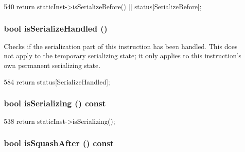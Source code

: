 \begin{DoxyCode}
540     { return staticInst->isSerializeBefore() || status[SerializeBefore]; }
\end{DoxyCode}
\hypertarget{classBaseDynInst_a33db384950219c3c71206fbb2c7d8025}{
\subsubsection[{isSerializeHandled}]{\setlength{\rightskip}{0pt plus 5cm}bool isSerializeHandled ()}}
\label{classBaseDynInst_a33db384950219c3c71206fbb2c7d8025}
Checks if the serialization part of this instruction has been handled. This does not apply to the temporary serializing state; it only applies to this instruction's own permanent serializing state. 


\begin{DoxyCode}
584 { return status[SerializeHandled]; }
\end{DoxyCode}
\hypertarget{classBaseDynInst_a0b876c794e1ed62f664670215da8793f}{
\subsubsection[{isSerializing}]{\setlength{\rightskip}{0pt plus 5cm}bool isSerializing () const}}
\label{classBaseDynInst_a0b876c794e1ed62f664670215da8793f}



\begin{DoxyCode}
538 { return staticInst->isSerializing(); }
\end{DoxyCode}
\hypertarget{classBaseDynInst_a11c92e1c9e4b69f9cb64a9794f1fef4c}{
\subsubsection[{isSquashAfter}]{\setlength{\rightskip}{0pt plus 5cm}bool isSquashAfter () const}}
\label{classBaseDynInst_a11c92e1c9e4b69f9cb64a9794f1fef4c}



